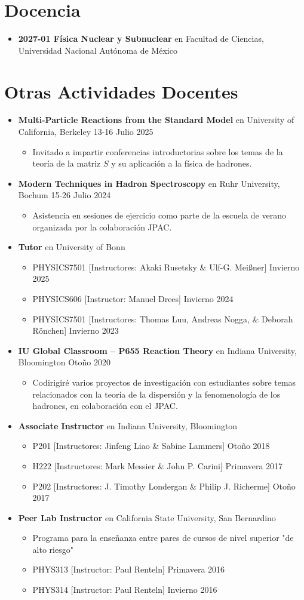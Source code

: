 \documentclass[letterpaper,11pt]{article}
\newcommand{\outerlist}[1]{
    \begin{itemize}[leftmargin=*] #1 \end{itemize}}
\newcommand{\innerlist}[1]{
    \begin{itemize}[topsep=0pt] #1 \end{itemize}}
\newcommand{\entry}[1]{\item\small{#1}}
\begin{document}

\section{Docencia}
\outerlist{
    \entry{\textbf{2027-01 Física Nuclear y Subnuclear} en Facultad de Ciencias, Universidad Nacional Autónoma de México}
}

\section{Otras Actividades Docentes}
\outerlist{
    \entry{\textbf{Multi-Particle Reactions from the Standard Model} en University of California, Berkeley \hfill 13-16 Julio 2025}
        \innerlist{
            \entry{Invitado a impartir conferencias introductorias sobre los temas de la teoría de la matriz $S$ y su aplicación a la física de hadrones.}
        }
    \entry{\textbf{Modern Techniques in Hadron Spectroscopy} en Ruhr University, Bochum \hfill 15-26 Julio 2024}
        \innerlist{
            \entry{Asistencia en sesiones de ejercicio como parte de la escuela de verano organizada por la colaboración JPAC.}
        }
\entry{\textbf{Tutor} en University of Bonn}
    \innerlist{
        \entry{PHYSICS7501 [Instructores: Akaki Rusetsky \& Ulf-G. Mei\ss ner] \hfill Invierno 2025}
        \entry{PHYSICS606 [Instructor: Manuel Drees] \hfill Invierno 2024}
        \entry{PHYSICS7501 [Instructores: Thomas Luu, Andreas Nogga, \& Deborah R\"{o}nchen] \hfill Invierno 2023}
    }
    \entry{\textbf{IU Global Classroom -- P655 Reaction Theory} en Indiana University, Bloomington \hfill Otoño 2020}
        \innerlist{
            \entry{Codirigiré varios proyectos de investigación con estudiantes sobre temas relacionados con la teoría de la dispersión y la fenomenología de los hadrones, en colaboración con el JPAC.}
        }
    \entry{\textbf{Associate Instructor} en Indiana University, Bloomington}
        \innerlist{
            \entry{P201 [Instructores: Jinfeng Liao \& Sabine Lammers] \hfill Otoño 2018}
            \entry{H222 [Instructores: Mark Messier \& John P. Carini] \hfill Primavera 2017}
            \entry{P202 [Instructores: J. Timothy Londergan \& Philip J. Richerme] \hfill Otoño 2017}
            
        }
\entry{\textbf{Peer Lab Instructor} en California State University, San Bernardino}
    \innerlist{
        \entry{Programa para la enseñanza entre pares de cursos de nivel superior "de alto riesgo"}
        \entry{PHYS313 [Instructor: Paul Renteln] \hfill Primavera 2016}
        \entry{PHYS314 [Instructor: Paul Renteln] \hfill Invierno 2016}
    }
} 
\end{document}
